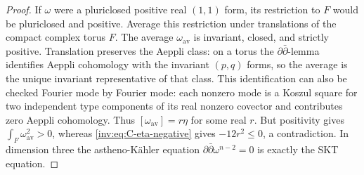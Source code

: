 \begin{proof}
If $\omega$ were a pluriclosed positive real $(1,1)$ form, its
restriction to $F$ would be pluriclosed and positive.  Average this
restriction under translations of the compact complex torus $F$.
The average $\omega_{\mathrm{av}}$ is invariant, closed, and
strictly positive.  Translation preserves the Aeppli class: on a
torus the $\partial\bar\partial$-lemma identifies Aeppli
cohomology with the invariant $(p,q)$ forms, so the average is the
unique invariant representative of that class.  This identification
can also be checked Fourier mode by Fourier mode: each nonzero mode
is a Koszul square for two independent type components of its real
nonzero covector and contributes zero Aeppli cohomology.  Thus
$[\omega_{\mathrm{av}}]=r\eta$ for some real $r$.
But positivity gives $\int_F\omega_{\mathrm{av}}^2>0$, whereas
\eqref{inv:eq:C-eta-negative} gives $-12r^2\le0$, a contradiction.
In dimension three the astheno-K\"ahler equation
$\partial\bar\partial\omega^{n-2}=0$ is exactly the SKT equation.
\end{proof}

